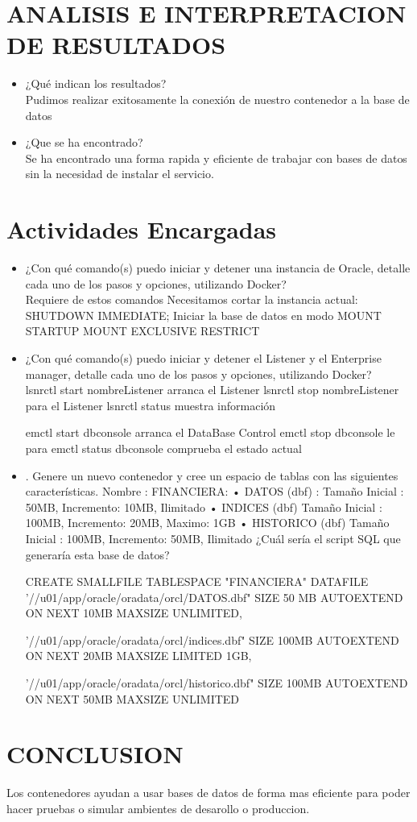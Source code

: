 \documentclass[preprint,12pt]{elsarticle}
\begin{document}
\section{ANALISIS E INTERPRETACION DE RESULTADOS }
\begin{itemize}
	\item ¿Qué indican los resultados? \\
	Pudimos realizar exitosamente la conexión de nuestro contenedor a la base de datos
	\item ¿Que se ha encontrado?\\
	Se ha encontrado una forma rapida y eficiente de trabajar con bases de datos sin la necesidad de instalar el servicio.
\end{itemize}

\section{Actividades Encargadas}
\begin{itemize}
	\item¿Con qué comando(s) puedo iniciar y detener una instancia de Oracle, detalle cada uno de los pasos y opciones, utilizando Docker?
 \\
Requiere de estos comandos
	Necesitamos cortar la instancia actual:
	SHUTDOWN IMMEDIATE;
	Iniciar la base de datos en modo MOUNT
	STARTUP MOUNT EXCLUSIVE RESTRICT

	\item ¿Con qué comando(s) puedo iniciar y detener el Listener y el Enterprise manager, detalle cada uno de los pasos y opciones, utilizando Docker?
\\
	lsnrctl start nombreListener arranca el Listener
	lsnrctl stop nombreListener para el Listener
	lsnrctl status muestra información

	emctl start dbconsole arranca el DataBase Control
	emctl stop dbconsole le para
	emctl status dbconsole comprueba el estado actual


	\item . Genere un nuevo contenedor y cree un espacio de tablas con las siguientes características.
Nombre : FINANCIERA:
• DATOS (dbf) : Tamaño Inicial : 50MB, Incremento: 10MB, Ilimitado
• INDICES (dbf) Tamaño Inicial : 100MB, Incremento: 20MB, Maximo: 1GB
• HISTORICO (dbf) Tamaño Inicial : 100MB, Incremento: 50MB, Ilimitado
¿Cuál sería el script SQL que generaría esta base de datos?
	

	CREATE SMALLFILE TABLESPACE "FINANCIERA"
	DATAFILE '//u01/app/oracle/oradata/orcl/DATOS.dbf"
	SIZE 50 MB AUTOEXTEND ON NEXT 10MB MAXSIZE UNLIMITED,

	'//u01/app/oracle/oradata/orcl/indices.dbf"
	SIZE 100MB AUTOEXTEND ON NEXT 20MB MAXSIZE LIMITED 1GB,

	'//u01/app/oracle/oradata/orcl/historico.dbf"
	SIZE 100MB AUTOEXTEND ON NEXT 50MB MAXSIZE UNLIMITED 
	
		
	
\end{itemize}


\section{CONCLUSION}
Los contenedores ayudan a usar bases de datos de forma mas eficiente para poder hacer pruebas o simular ambientes de desarollo o produccion.
\end{document}
